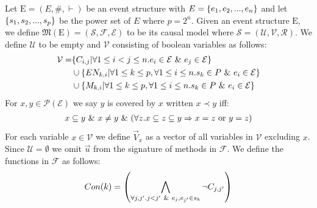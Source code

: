 Let $\mathrm{E} = (E,\#,\vdash)$ be an event structure with
$E = \{e_1, e_2, ...,e_n\}$ and let $\{s_1,s_2,...,s_p\}$ be the power set of $E$ where $p = 2^n$.
Given an event structure $\mathrm{E}$, we define
$\mathfrak{M}(\mathrm{E}) = (\mathcal{S},\mathcal{F},\mathcal{E})$
to be its causal model where
$\mathcal{S} = (\mathcal{U},\mathcal{V},\mathcal{R})$.
We define $\mathcal{U}$ to be empty and $\mathcal{V}$ consisting
of boolean variables as follows:
\begin{align*}
    \mathcal{V} = & \{C_{i,j} | \forall 1 \leq i < j \leq n. e_i \in \mathcal{E} \ \& \  e_j \in \mathcal{E}\}                     \\
                  & \cup \{EN_{k,i} | \forall 1 \leq k \leq p , \forall 1 \leq i \leq n . s_k \in P \ \& \  e_i \in \mathcal{E} \} \\
                  & \cup \{M_{k,i} | \forall 1 \leq k \leq p , \forall 1 \leq i \leq n . s_k \in P \ \& \  e_i \in \mathcal{E} \}
\end{align*}
For $x,y \in \mathcal{P}(\mathcal{E})$ we say $y$ is covered by $x$ written $ x \prec y$ iff:
\begin{align*}
    x \subseteq y \ \& \  x \neq y \ \& \ 
    (\forall z. x \subseteq z \subseteq y \Rightarrow x = z
    \text{ or } y = z)
\end{align*}
For each variable $x \in \mathcal{V}$ we define $\vec V_x$ as a vector
of all variables in $\mathcal{V}$ excluding $x$.
Since $\mathcal{U} = \emptyset$ we omit $\vec u$ from the
signature of methods in $\mathcal{F}$.
We define the functions in $\mathcal{F}$ as follows:
\begin{align*}
    Con(k) & =   \left(
    \bigwedge_{\forall j,j'. j<j' \ \& \  e_j,e_{j'} \in s_k}
    \neg C_{j,j'}
    \right)             \\
\end{align*}
